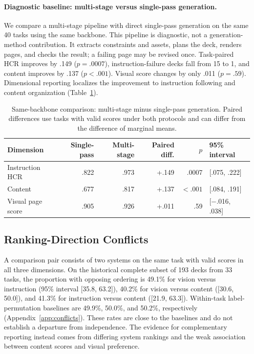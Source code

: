 \paragraph{Diagnostic baseline: multi-stage versus single-pass generation.}
We compare a multi-stage pipeline with direct single-pass generation on the same 40 tasks using the same backbone. This pipeline is diagnostic, not a generation-method contribution. It extracts constraints and assets, plans the deck, renders pages, and checks the result; a failing page may be revised once. Task-paired HCR improves by .149 ($p=.0007$), instruction-failure decks fall from 15 to 1, and content improves by .137 ($p<.001$). Visual score changes by only .011 ($p=.59$). Dimensional reporting localizes the improvement to instruction following and content organization (Table~\ref{tab:paired}).

\begin{table}[t]
\caption{Same-backbone comparison: multi-stage minus single-pass generation. Paired differences use tasks with valid scores under both protocols and can differ from the difference of marginal means.}
\label{tab:paired}\centering\small
\begin{tabular}{@{}lrrrrl@{}}
\toprule Dimension & Single-pass & Multi-stage & Paired diff. & $p$ & 95\% interval\\\midrule
Instruction HCR & .822 & .973 & +.149 & .0007 & [.075, .222]\\
Content & .677 & .817 & +.137 & $<.001$ & [.084, .191]\\
Visual page score & .905 & .926 & +.011 & .59 & [$-$.016, .038]\\\bottomrule
\end{tabular}
\end{table}

\subsection{Ranking-Direction Conflicts}
A comparison pair consists of two systems on the same task with valid scores in all three dimensions. On the historical complete subset of 193 decks from 33 tasks, the proportion with opposing ordering is 49.1\% for vision versus instruction (95\% interval [35.8, 63.2]), 40.2\% for vision versus content ([30.6, 50.0]), and 41.3\% for instruction versus content ([21.9, 63.3]). Within-task label-permutation baselines are 49.9\%, 50.0\%, and 50.2\%, respectively (Appendix~\ref{app:conflicts}). These rates are close to the baselines and do not establish a departure from independence. The evidence for complementary reporting instead comes from differing system rankings and the weak association between content scores and visual preference.

